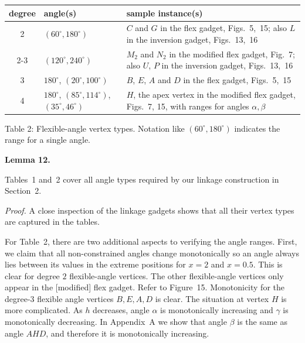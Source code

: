 \documentclass{article}
\begin{document}
\begin{center}
\begin{tabular}{|c|l|p{3.5in}|}
\hline
degree & angle(s) & sample instance(s) \\ \hline
2 & $(60^{\circ}, 180^{\circ})$ & $C$ and $G$ in the flex gadget, 
Figs.~5,~15;
also  $L$ in the inversion gadget, Figs.~13,~16 \\
\cmidrule{2-3}
 & $(120^{\circ}, 240^{\circ})$ & $M_2$ and $N_2$ in the modified flex gadget,  Fig.~7; also $U$, $P$ in the inversion gadget, 
Figs.~13,~16 \\ 
\hline
3& $180^{\circ}$, $(20^{\circ},100^{\circ})$ & 
$B$, $E$, $A$ and $D$ in the flex gadget, 
Figs.~5,~15
\\ \hline
4 & $180^{\circ}$, 
$(85^\circ,114^\circ)$, $(35^{\circ},46^{\circ})$
& $H$, the apex vertex in the modified flex gadget, Figs.~7, 15, with ranges for angles $\alpha, \beta$ \\ \hline
\end{tabular}
\end{center}
\begin{center}
Table 2: Flexible-angle vertex types. Notation like $(60^\circ, 180^\circ)$ indicates the range for a single angle.
\end{center}

\par\medskip\noindent\textbf{Lemma 12.} \begin{itshape}
Tables~1 and~2 cover all angle types required by our linkage construction in Section~2. 
\end{itshape}\par\medskip
\par\noindent\textit{Proof.} 
A close inspection of the linkage gadgets shows that all their vertex types are captured in the tables.

For Table~2, there are two additional aspects to verifying the angle ranges.  First, we claim that all non-constrained angles change 
monotonically so an angle always lies between its values in the extreme positions for $x=2$ and $x = 0.5$. 
This is clear for 
degree $2$ flexible-angle vertices.  The other flexible-angle vertices only appear in the [modified] flex gadget.  Refer to Figure~15. 
Monotonicity 
for the degree-$3$ flexible angle vertices $B,E,A,D$ is clear.
The situation at vertex $H$ is more complicated.  As $h$ decreases, angle $\alpha$ is monotonically increasing and $\gamma$ is monotonically decreasing.   
In Appendix~A we show that angle $\beta$ is the same as angle $AHD$, and therefore it is monotonically increasing. 
\end{document}
